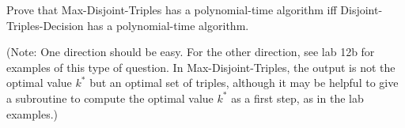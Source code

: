 \documentclass[11pt]{article}
\begin{document}
\begin{description}
Prove that {\sc Max-Disjoint-Triples} has a polynomial-time algorithm iff {\sc Disjoint-Triples-Decision}
has a polynomial-time algorithm.  

(Note: One direction should be easy.  For the other direction, see lab 12b for examples of this type of question. In {\sc Max-Disjoint-Triples},
the output is not the optimal value $k^*$ but an optimal set of triples, although it may be helpful to give a subroutine to compute the optimal value $k^*$ as a first step, as in the lab examples.)


\end{description}
\end{document}
